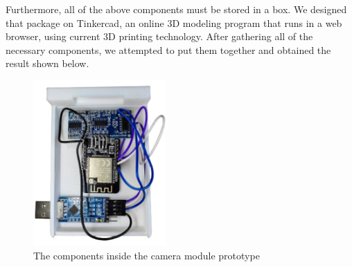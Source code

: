 Furthermore, all of the above components must be stored in a box. We designed that package on Tinkercad, an online 3D modeling program that runs in a web browser, using current 3D printing technology. After gathering all of the necessary components, we attempted to put them together and obtained the result shown below.

\begin{figure}[H]
	\centering
	\includegraphics[width=0.45\textwidth]{img/Chap5/Prototype_View_inside.png}
	\caption{The components inside the camera module prototype}
\end{figure}

